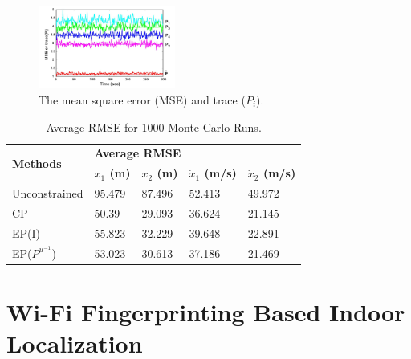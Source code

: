 \documentclass{ieeeaccess}
\begin{document}
\begin{figure}[t!]
\centering
\caption{The mean square error (MSE) and trace ($P_i$).}
\label{cpf_result_image}
\includegraphics[width=0.4\textwidth]{cpf_result_image.png}
\end{figure}

\begin{table}
\centering
\begin{tabular}{lllll}
\hline
\multirow{2}{*}{\textbf{Methods}} & \multicolumn{4}{l}{\textbf{Average RMSE}} \\ \cline{2-5} 
                  &     \textbf{$x_1$ (m)} & \textbf{$x_2$ (m)}     &  \textbf{$\dot{x}_1$ (m/s)}   &  \textbf{$\dot{x}_2$ (m/s)}  \\ \hline
             Unconstrained     &   95.479  &   87.496  &   52.413  &  49.972  \\
               CP   &  50.39   &   29.093  &  36.624   &  21.145  \\
               EP(I)   &   55.823  &  32.229   &  39.648   &  22.891  \\
               EP(${P^{u^{-1}}}$)   &  53.023   &   30.613  &   37.186  &  21.469  \\ \hline
\end{tabular}
\label{cpf_result_table}
\caption{Average RMSE for 1000 Monte Carlo Runs.}
\end{table}

\section{Wi-Fi Fingerprinting Based Indoor Localization}
\end{document}
